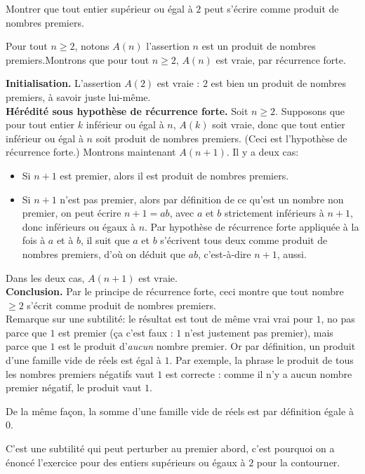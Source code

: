 \begin{exo}
Montrer que tout entier supérieur ou égal à $2$ peut s'écrire comme produit de nombres premiers.

\begin{sol}
Pour tout $n\geq 2$, notons $A(n)$ l'assertion \og $n$ est un produit de nombres premiers.\fg Montrons que pour tout $n\geq 2$, $A(n)$ est vraie, par récurrence forte.

\textbf{Initialisation.} L'assertion $A(2)$ est vraie : $2$ est bien un produit de nombres premiers, à savoir juste lui-même.\\
\textbf{Hérédité sous hypothèse de récurrence forte.} Soit $n\geq 2$. Supposons que pour tout entier $k$ inférieur ou égal à $n$, $A(k)$ soit vraie, donc que tout entier inférieur ou égal à $n$ soit produit de nombres premiers. (Ceci est l'hypothèse de récurrence forte.) Montrons maintenant $A(n+1)$. Il y a deux cas:
\begin{itemize}
\item Si $n+1$ est premier, alors il est produit de nombres premiers.
\item Si $n+1$ n'est pas premier, alors par définition de ce qu'est un nombre non premier, on peut écrire $n+1 = ab$, avec $a$ et $b$ strictement inférieurs à $n+1$, donc inférieurs ou égaux à $n$. Par hypothèse de récurrence forte appliquée à la fois à $a$ et à $b$, il suit que $a$ et $b$ s'écrivent tous deux comme produit de nombres premiers, d'où on déduit que $ab$, c'est-à-dire $n+1$, aussi. 
\end{itemize}
Dans les deux cas, $A(n+1)$ est vraie.\\
\textbf{Conclusion.} Par le principe de récurrence forte, ceci montre que tout nombre $\geq 2$ s'écrit comme produit de nombres premiers.\\


Remarque sur une subtilité: le résultat est tout de même vrai vrai pour $1$, no pas parce que $1$ est premier (ça c'est faux : $1$ n'est justement pas premier), mais parce que $1$ est le produit d'\emph{aucun} nombre premier. Or par définition, un produit d'une famille vide de réels est égal à $1$. Par exemple, la phrase \og le produit de tous les nombres premiers négatifs vaut $1$\fg{} est correcte : comme il n'y a aucun nombre premier négatif, le produit vaut $1$.

De la même façon, la somme d'une famille vide de réels est par définition égale à $0$. 

C'est une subtilité qui peut perturber au premier abord, c'est pourquoi on a énoncé l'exercice pour des entiers supérieurs ou égaux à $2$ pour la contourner.
\end{sol}
\end{exo}

